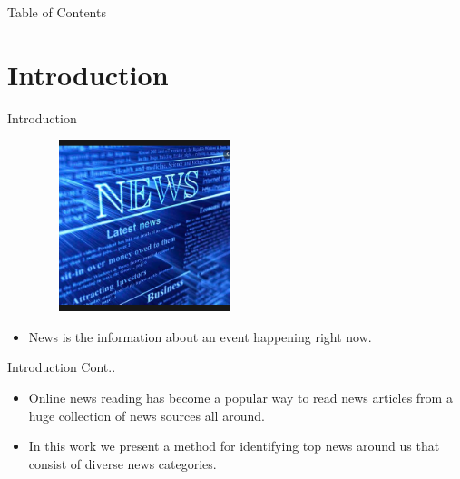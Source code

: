 \begin{frame}{Table of Contents}
		\tableofcontents
\end{frame}
\section{Introduction}
\begin{frame}{Introduction}
\begin{center}
	    \includegraphics[width=8cm, height=5cm]{1.lapa/Shot.png}
		\begin{itemize}
			\item \Large{News is the information about an event happening right now.}
		\end{itemize}
	\end{center}	
\end{frame}
\begin{frame}{Introduction Cont..}
\begin{itemize}
			\item \Large Online news reading has become a popular way to read news articles from a huge collection of news sources all around.
\end{itemize}
\begin{itemize}
			\item \Large In this work we present a method for identifying top news around us that consist of diverse news categories.
\end{itemize}

\end{frame}